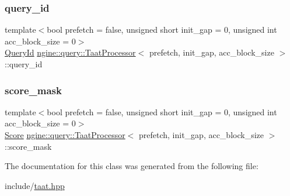 \mbox{\label{classngine_1_1query_1_1TaatProcessor_a40071c737df3c2ef19f7d05dcfaeeabf}} 
\subsubsection{\texorpdfstring{query\+\_\+id}{query\_id}}
{\footnotesize\ttfamily template$<$bool prefetch = false, unsigned short init\+\_\+gap = 0, unsigned int acc\+\_\+block\+\_\+size = 0$>$ \\
\hyperlink{namespacengine_1_1query_a3deddbc36af48dca2072f880a752b001}{Query\+Id} \hyperlink{classngine_1_1query_1_1TaatProcessor}{ngine\+::query\+::\+Taat\+Processor}$<$ prefetch, init\+\_\+gap, acc\+\_\+block\+\_\+size $>$\+::query\+\_\+id\hspace{0.3cm}{\ttfamily [protected]}}

\mbox{\label{classngine_1_1query_1_1TaatProcessor_a3112a7c3c9039dca39892fb914fcfb80}} 
\subsubsection{\texorpdfstring{score\+\_\+mask}{score\_mask}}
{\footnotesize\ttfamily template$<$bool prefetch = false, unsigned short init\+\_\+gap = 0, unsigned int acc\+\_\+block\+\_\+size = 0$>$ \\
\hyperlink{structngine_1_1Score}{Score} \hyperlink{classngine_1_1query_1_1TaatProcessor}{ngine\+::query\+::\+Taat\+Processor}$<$ prefetch, init\+\_\+gap, acc\+\_\+block\+\_\+size $>$\+::score\+\_\+mask\hspace{0.3cm}{\ttfamily [protected]}}



The documentation for this class was generated from the following file\+:\begin{DoxyCompactItemize}
\item 
include/\hyperlink{taat_8hpp}{taat.\+hpp}\end{DoxyCompactItemize}
